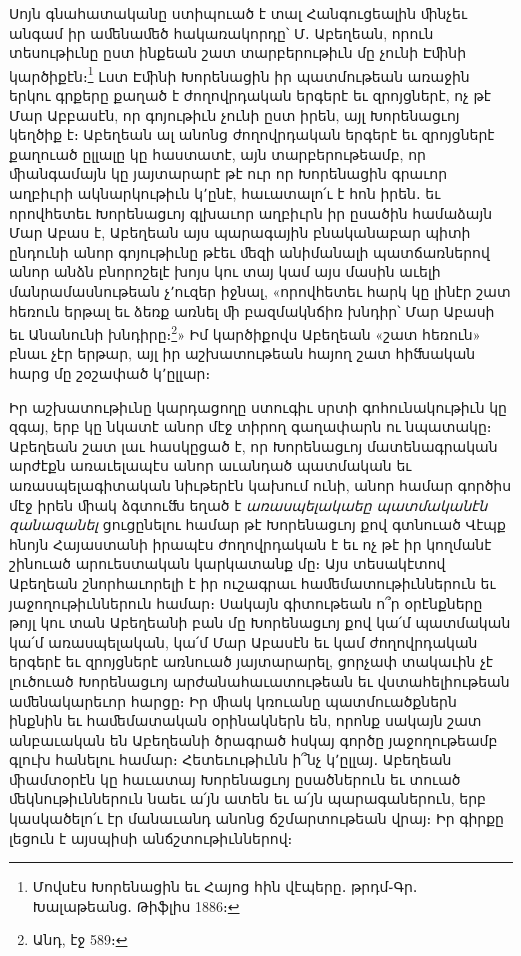 \documentclass{article}
\begin{document}
{Սոյն գնահատականը ստիպուած է տալ Հանգուցեալին ﬕնչեւ անգամ իր աﬔնաﬔծ հակառակորդը՝ Մ․ Աբեղեան, որուն տեսութիւնը ըստ ինքեան շատ տարբերութիւն մը չունի Էﬕնի կարծիքէն։\footnote{Մովսէս Խորենացին եւ Հայոց հին վէպերը․ թրդմ֊Գր․ Խալաթեանց․ Թիֆլիս 1886։} Լստ Էﬕնի Խորենացին իր պատմութեան առաջին երկու գրքերը քաղած է ժողովրդական երգերէ եւ զրոյցներէ, ոչ թէ Մար Աբբասէն, որ գոյութիւն չունի ըստ իրեն, այլ Խորենացւոյ կեղծիք է։ Աբեղեան ալ անոնց ժողովրդական երգերէ եւ զրոյցներէ քաղուած ըլլալը կը հաստատէ, այն տարբերութեամբ, որ ﬕանգամայն կը յայտարարէ թէ ուր որ Խորենացին գրաւոր աղբիւրի ակնարկութիւն կ՚ընէ, հաւատալո՛ւ է հոն իրեն․ եւ որովհետեւ Խորենացւոյ գլխաւոր աղբիւրն իր ըսածին համաձայն Մար Աբաս է, Աբեղեան այս պարագային բնականաբար պիտի ընդունի անոր գոյութիւնը թէեւ ﬔզի անիմանալի պատճառներով անոր անձն բնորոշելէ խոյս կու տայ կամ այս մասին աւելի մանրամասնութեան չ՚ուզեր իջնալ, «որովհետեւ հարկ կը լինէր շատ հեռուն երթալ եւ ձեռք առնել ﬕ բազմակնճիռ խնդիր՝ Մար Աբասի եւ Անանունի խնդիրը։\footnote{Անդ, էջ 589։}» Իմ կարծիքովս Աբեղեան «շատ հեռուն» բնաւ չէր երթար, այլ իր աշխատութեան հայող շատ հիﬓական հարց մը շօշափած կ՚ըլլար։

Իր աշխատութիւնը կարդացողը ստուգիւ սրտի գոհունակութիւն կը զգայ, երբ կը նկատէ անոր մէջ տիրող գաղափարն ու նպատակը։ Աբեղեան շատ լաւ հասկըցած է, որ Խորենացւոյ մատենագրական արժէքն առաւելապէս անոր աւանդած պատմական եւ առասպելագիտական նիւթերէն կախում ունի, անոր համար գործիս մէջ իրեն ﬕակ ձգտուﬓ եղած է \emph{առասպելակաեը պատմականէն զանազանել} ցուցընելու համար թէ Խորենացւոյ քով գտնուած Վէպք հնոյն Հայաստանի իրապէս ժողովրդական է եւ ոչ թէ իր կողմանէ շինուած արուեստական կարկատանք մը։ Այս տեսակէտով Աբեղեան շնորհաւորելի է իր ուշագրաւ հաﬔմատութիւններուն եւ յաջողութիւններուն համար։ Սակայն գիտութեան ո՞ր օրէնքները թոյլ կու տան Աբեղեանի բան մը Խորենացւոյ քով կա՛մ պատմական կա՛մ առասպելական, կա՛մ Մար Աբասէն եւ կամ ժողովրդական երգերէ եւ զրոյցներէ առնուած յայտարարել, ցորչափ տակաւին չէ լուծուած Խորենացւոյ արժանահաւատութեան եւ վստահելիութեան աﬔնակարեւոր հարցը։ Իր ﬕակ կռուանը պատմուածքներն ինքնին եւ հաﬔմատական օրինակներն են, որոնք սակայն շատ անբաւական են Աբեղեանի ծրագրած հսկայ գործը յաջողութեամբ գլուխ հանելու համար։ Հետեւութիւնն ի՞նչ կ՚ըլլայ․ Աբեղեան ﬕամտօրէն կը հաւատայ Խորենացւոյ ըսածներուն եւ տուած ﬔկնութիւններուն նաեւ ա՛յն ատեն եւ ա՛յն պարագաներուն, երբ կասկածելո՛ւ էր մանաւանդ անոնց ճշմարտութեան վրայ։ Իր գիրքը լեցուն է այսպիսի անճշտութիւններով։

}
\end{document}
